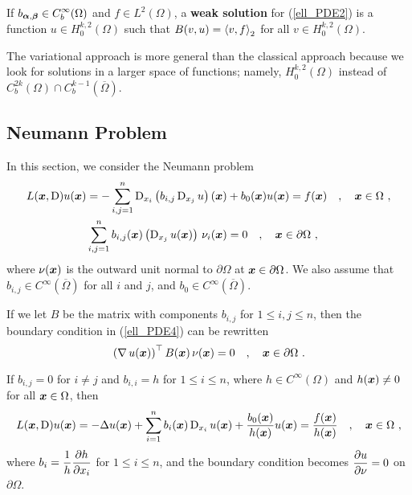 \begin{defn} \label{ell_wf_Dir_probl}
If $\displaystyle b_{{\bm{\alpha}},{\bm{\beta}}} \in C^\infty_b(\Omega)$ and
$\displaystyle f \in L^2(\Omega)$,
a {\bfseries weak solution}
for (\ref{ell_PDE2}) is a function
$\displaystyle u \in H^{k,2}_0(\Omega)$ such that
$\displaystyle B(v,u) = \left\langle{v} , {f}\right\rangle_{2}$ for all
$\displaystyle v \in H^{k,2}_0(\Omega)$.
\end{defn}

The variational approach is more general than the classical
approach because we look for solutions in a larger space
of functions; namely, $\displaystyle H^{k,2}_0(\Omega)$ instead of
$\displaystyle C^{2k}_b(\Omega)\cap C^{k-1}_b(\overline{\Omega})$.

\subsection{Neumann Problem}

In this section, we consider the Neumann problem
\begin{equation} \label{ell_PDE4}
\begin{split}
L({\bm{x}}, \operatorname{D})u({\bm{x}}) &= -\sum_{i,j=1}^n
\operatorname{D}_{x_i} \left( b_{i,j} \operatorname{D}_{x_j} u \right)({\bm{x}})
+ b_0({\bm{x}})u({\bm{x}}) = f({\bm{x}})
\quad , \quad {\bm{x}} \in \Omega \ ,\\
& \sum_{i,j=1}^n b_{i,j}({\bm{x}}) \left( \operatorname{D}_{x_j}u({\bm{x}}) \right)\,
\nu_i({\bm{x}})= 0
\quad , \quad {\bm{x}} \in \partial \Omega \ ,
\end{split}
\end{equation}
where $\nu({\bm{x}})$ is the outward unit normal to
$\partial \Omega$ at ${\bm{x}} \in \partial \Omega$.  We also assume
that $\displaystyle b_{i,j} \in C^\infty(\overline{\Omega})$ for all
$i$ and $j$, and $\displaystyle b_0 \in C^\infty(\overline{\Omega})$.

If we let $B$ be the \nn matrix with components $b_{i,j}$ for
$1\leq i,j\leq n$, then the boundary condition in (\ref{ell_PDE4}) can
be rewritten
\[
\left( \operatorname{\nabla} u({\bm{x}}) \right)^\top B({\bm{x}})\, \nu({\bm{x}}) = 0
\quad , \quad {\bm{x}} \in \partial \Omega \ .
\]

\begin{egg}
If $b_{i,j} = 0$ for $i \neq j$ and              \label{ell_PDE_egg1}
$b_{i,i} = h$ for $1 \leq i \leq n$, where
$\displaystyle h \in C^{\infty}(\Omega)$
and $h({\bm{x}}) \neq 0$ for all ${\bm{x}} \in \Omega$, then
\[
L({\bm{x}},\operatorname{D}) u({\bm{x}})= -\Delta u({\bm{x}}) + \sum_{i=1}^n
b_i({\bm{x}}) \operatorname{D}_{x_i} u({\bm{x}}) +
\frac{b_0({\bm{x}})}{h({\bm{x}})}u({\bm{x}}) = \frac{f({\bm{x}})}{h({\bm{x}})}
\quad , \quad {\bm{x}} \in \Omega \ ,
\]
where $\displaystyle b_i = \frac{1}{h}\frac{\partial{h}}{\partial x_i}$ for $1 \leq i \leq n$,
and the boundary condition becomes
$\displaystyle \frac{\partial{u}}{\partial \nu} = 0$ on $\partial \Omega$.
\end{egg}


